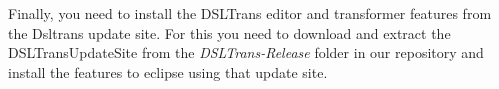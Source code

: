 Finally, you need to install the DSLTrans editor and transformer features from the Dsltrans update site.
For this you need to download and extract the DSLTransUpdateSite from the \emph{DSLTrans-Release} folder in our repository and install the features to eclipse using that update site.

\clearpage

